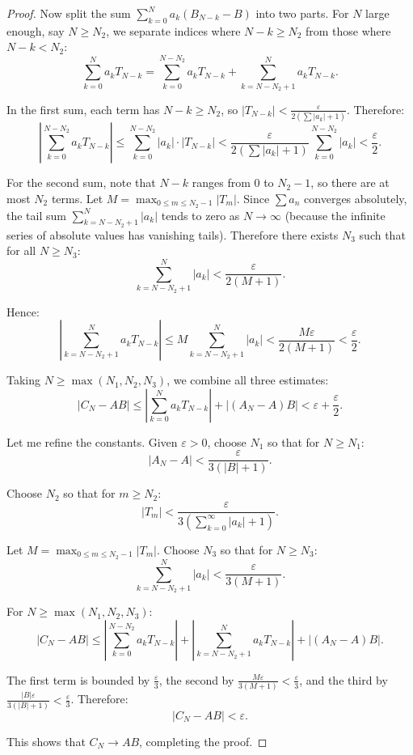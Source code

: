 \begin{proof}
    Now split the sum $\sum_{k=0}^N a_k (B_{N-k} - B)$ into two parts. For $N$ large enough, say $N \geq N_2$, we separate indices where $N - k \geq N_2$ from those where $N - k < N_2$:
    $$\sum_{k=0}^N a_k T_{N-k} = \sum_{k=0}^{N-N_2} a_k T_{N-k} + \sum_{k=N-N_2+1}^N a_k T_{N-k}.$$

    In the first sum, each term has $N - k \geq N_2$, so $|T_{N-k}| < \frac{\varepsilon}{2(\sum |a_k| + 1)}$. Therefore:
    $$\left|\sum_{k=0}^{N-N_2} a_k T_{N-k}\right| \leq \sum_{k=0}^{N-N_2} |a_k| \cdot |T_{N-k}| < \frac{\varepsilon}{2(\sum |a_k| + 1)} \sum_{k=0}^{N-N_2} |a_k| < \frac{\varepsilon}{2}.$$

    For the second sum, note that $N - k$ ranges from $0$ to $N_2 - 1$, so there are at most $N_2$ terms. Let $M = \max_{0 \leq m \leq N_2-1} |T_m|$. Since $\sum a_n$ converges absolutely, the tail sum $\sum_{k=N-N_2+1}^N |a_k|$ tends to zero as $N \to \infty$ (because the infinite series of absolute values has vanishing tails). Therefore there exists $N_3$ such that for all $N \geq N_3$:
    $$\sum_{k=N-N_2+1}^N |a_k| < \frac{\varepsilon}{2(M + 1)}.$$

    Hence:
    $$\left|\sum_{k=N-N_2+1}^N a_k T_{N-k}\right| \leq M \sum_{k=N-N_2+1}^N |a_k| < \frac{M\varepsilon}{2(M + 1)} < \frac{\varepsilon}{2}.$$

    Taking $N \geq \max(N_1, N_2, N_3)$, we combine all three estimates:
    $$|C_N - AB| \leq \left|\sum_{k=0}^N a_k T_{N-k}\right| + |(A_N - A)B| < \varepsilon + \frac{\varepsilon}{2}.$$

    Let me refine the constants. Given $\varepsilon > 0$, choose $N_1$ so that for $N \geq N_1$:
    $$|A_N - A| < \frac{\varepsilon}{3(|B| + 1)}.$$

    Choose $N_2$ so that for $m \geq N_2$:
    $$|T_m| < \frac{\varepsilon}{3(\sum_{k=0}^\infty |a_k| + 1)}.$$

    Let $M = \max_{0 \leq m \leq N_2-1} |T_m|$. Choose $N_3$ so that for $N \geq N_3$:
    $$\sum_{k=N-N_2+1}^N |a_k| < \frac{\varepsilon}{3(M + 1)}.$$

    For $N \geq \max(N_1, N_2, N_3)$:
    $$|C_N - AB| \leq \left|\sum_{k=0}^{N-N_2} a_k T_{N-k}\right| + \left|\sum_{k=N-N_2+1}^N a_k T_{N-k}\right| + |(A_N - A)B|.$$

    The first term is bounded by $\frac{\varepsilon}{3}$, the second by $\frac{M\varepsilon}{3(M+1)} < \frac{\varepsilon}{3}$, and the third by $\frac{|B|\varepsilon}{3(|B|+1)} < \frac{\varepsilon}{3}$. Therefore:
    $$|C_N - AB| < \varepsilon.$$

    This shows that $C_N \to AB$, completing the proof.
\end{proof}
